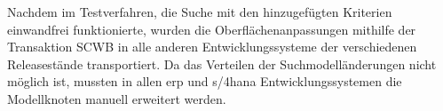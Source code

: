 Nachdem im Testverfahren, die Suche mit den hinzugefügten Kriterien einwandfrei funktionierte, wurden die Oberflächenanpassungen mithilfe der Transaktion SCWB in alle anderen Entwicklungssysteme der verschiedenen Releasestände transportiert. Da das Verteilen der Suchmodelländerungen nicht möglich ist, mussten in allen \ac{erp} und \acs{s/4hana} Entwicklungssystemen die Modellknoten manuell erweitert werden.


